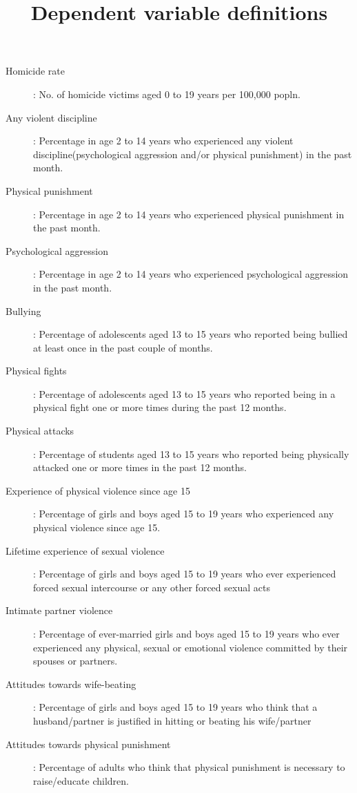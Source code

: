 \title{Dependent variable definitions}
\begin{description}
\item[Homicide rate]: No. of homicide victims aged 0 to 19 years per 100,000 popln.
\item[Any violent discipline]: Percentage in age 2 to 14 years who experienced any 
violent discipline(psychological aggression and/or physical punishment) in the past month.
\item[Physical punishment]: Percentage in age 2 to 14 years who experienced physical punishment
in the past month.
\item[Psychological aggression]: Percentage in age 2 to 14 years who experienced psychological 
aggression in the past month.
\item[Bullying]: Percentage of adolescents aged 13 to 15 years who reported being bullied at
least once in the past couple of months.
\item[Physical fights]: Percentage of adolescents aged 13 to 15 years who reported being in 
a physical fight one or more times during the past 12 months.
\item[Physical attacks]: Percentage of students aged 13 to 15 years who reported being physically 
attacked one or more times in
the past 12 months.
\item[Experience of physical violence since age 15]: Percentage of girls and boys aged 15 to 19 years 
who experienced any physical violence since age 15.
\item[Lifetime experience of sexual violence]: Percentage of girls and boys aged 15 to 19 years who ever
experienced forced sexual intercourse or any other forced sexual acts
\item[Intimate partner violence]: Percentage of ever-married girls and boys aged 15 to 19 years who ever experienced any
physical, sexual or emotional violence committed by their
spouses or partners.
\item[Attitudes towards wife-beating]: Percentage of girls and boys aged 15 to 19 years who think that a husband/partner is justified in hitting or beating his wife/partner 
\item[Attitudes towards physical punishment]: Percentage of adults who think that physical punishment is necessary to raise/educate children.
\end{description}